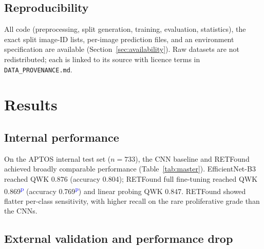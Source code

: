 \documentclass[11pt,a4paper]{article}
\newcommand{\prov}[1]{#1\textsuperscript{\textcolor{blue}{p}}} %
\begin{document}
\subsection{Reproducibility}

All code (preprocessing, split generation, training, evaluation, statistics),
the exact split image-ID lists, per-image prediction files, and an environment
specification are available (Section~\ref{sec:availability}). Raw datasets are
not redistributed; each is linked to its source with licence terms in
\texttt{DATA\_PROVENANCE.md}.

\section{Results}

\subsection{Internal performance}

On the APTOS internal test set ($n=733$), the CNN baseline and RETFound achieved
broadly comparable performance (Table~\ref{tab:master}). EfficientNet-B3 reached
QWK \num{0.876} (accuracy \num{0.804}); RETFound full fine-tuning reached QWK
\prov{\num{0.869}} (accuracy \prov{\num{0.769}}) and linear probing QWK
\num{0.847}. RETFound showed flatter per-class sensitivity, with higher recall
on the rare proliferative grade than the CNNs.

\subsection{External validation and performance drop}
\end{document}
